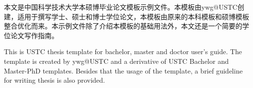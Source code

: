 ﻿
\begin{cnabstract}
本文是中国科学技术大学本硕博毕业论文模板示例文件。本模板由ywg@USTC创建，适用于撰写学士、硕士和博士学位论文，本模板由原来的本科模板和硕博模板整合优化而来。本示例文件除了介绍本模板的基础用法外，本文还是一个简要的学位论文写作指南。

\end{cnabstract}


\begin{enabstract}

This is USTC thesis template for bachelor, master and doctor user's guide. The template is created by ywg@USTC and a derivative of USTC Bachelor and Master-PhD templates. Besides that
the usage of the template, a brief
guideline for writing thesis is also provided.


\end{enabstract}
